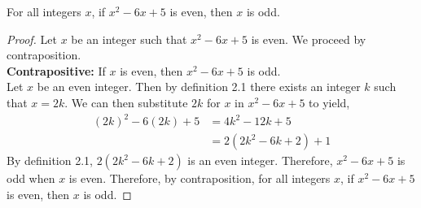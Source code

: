 \documentclass[12pt]{article}
\newenvironment{theorem}[2][Theorem]{\begin{trivlist}
\item[\hskip \labelsep {\bfseries #1}\hskip \labelsep {\bfseries #2.}]}{\end{trivlist}}
\begin{document}
\begin{theorem}{6}
	For all integers $x$, if $x^2-6x+5$ is even, then $x$ is odd.
\end{theorem}
\begin{proof}
	Let $x$ be an integer such that $x^2-6x+5$ is even. We proceed by contraposition.\\
	\textbf{Contrapositive:} If $x$ is even, then $x^2-6x+5$ is odd.\\
	Let $x$ be an even integer. Then by definition 2.1 there exists an integer $k$ such
	that $x=2k$.
	We can then substitute $2k$ for $x$ in $x^2-6x+5$ to yield,
	\begin{align*}
		(2k)^2-6(2k)+5 &= 4k^2-12k+5\\
		&= 2(2k^2-6k+2)+1
	\end{align*}
	By definition 2.1, $2(2k^2-6k+2)$ is an even integer. Therefore, $x^2-6x+5$ is odd when
	$x$ is even.
	Therefore, by contraposition, for all integers $x$, if $x^2-6x+5$ is even, then $x$ is odd.
\end{proof}
\end{document}
